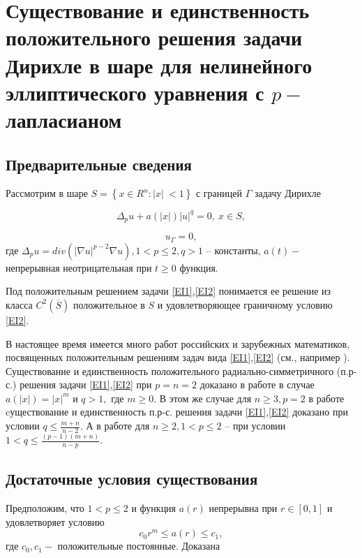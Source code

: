 \chapter{Существование и единственность положительного решения задачи Дирихле в шаре для нелинейного эллиптического уравнения с $p-$ лапласианом}

\section{Предварительные сведения}
Рассмотрим в шаре
$ S=\left\{x\in R^n:\vert x \vert\ < 1 \right\} $
 с границей $\Gamma $ задачу Дирихле

\begin{equation}\label{EI1}
\Delta_{p} u+a(|x|){\vert u \vert}^q=0,\ x \in S,
\end{equation}

\begin{equation}\label{EI2}
u_\Gamma=0,      
\end{equation}
где $ \Delta_{p} u=div(\vert \nabla u\vert^{p-2}\nabla u),
 1<p \le2, q > 1$ -- константы, $a(t)-$ непрерывная неотрицательная
 при $t\geq 0 $ функция.

Под положительным решением
задачи \eqref{EI1},\eqref{EI2} понимается ее решение из класса $ C^2(\overline S) $
 положительное в $S$ и удовлетворяющее граничному условию \eqref{EI2}.

В настоящее время имеется много работ российских и зарубежных
математиков, посвященных положительным решениям задач вида \eqref{EI1},\eqref{EI2}
(см., например \cite{LitEI1, LitEI2, LitEI3, LitEI4, LitEI5, LitEI6, LitEI7, LitEI8, LitEI9}). Существование и единственность
положительного радиально-симметричного (п.р-с.)
 решения задачи \eqref{EI1},\eqref{EI2} при $p=n=2$ доказано в работе
 \cite{LitEI7} в случае $a(|x|)=|x|^m$ и $q>1,$ где $m \geq 0.$
 В этом же случае для $ n\geq 3, p=2 $  в работе  \cite{LitEI8} cуществование и
единственность п.р-с. решения задачи \eqref{EI1},\eqref{EI2} доказано
 при условии  $ q \leq \frac {m+n}{n-2} $. А в работе \cite{LitEI9} для  
 $n\geq 2, 1<p\leq 2$ -- при условии  $ 1<q\leq \frac{(p-1)(m+n)}{n-p}$.
 
\section{Достаточные условия существования}
Предположим, что $1<p\leq 2 $ и функция $a(r)$ непрерывна при $r
\in[0,1]$ и удовлетворяет условию
\begin{equation}\label{EI3}
 c_0r^m \leq a(r)\leq c_1,
\end{equation}
 где $c_0, c_1- $ положительные постоянные. Доказана

